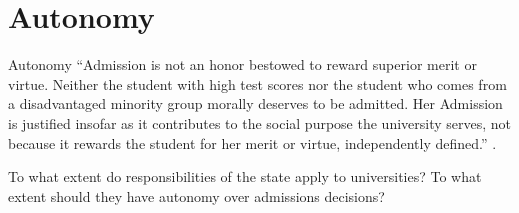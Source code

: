 \documentclass[ignorenonframetext, aspectratio=169]{beamer}
\begin{document}
\section{Autonomy}
\begin{frame}{Autonomy}
``Admission is not an honor bestowed to reward superior merit or virtue. Neither the student with high test scores nor the student who comes from a disadvantaged minority group morally deserves to be admitted. Her Admission is justified insofar as it contributes to the social purpose the university serves, not because it rewards the student for her merit or virtue, independently defined.'' .

To what extent do responsibilities of the state apply to universities? To  what extent should they have autonomy over admissions decisions?
\end{frame}
\end{document}
